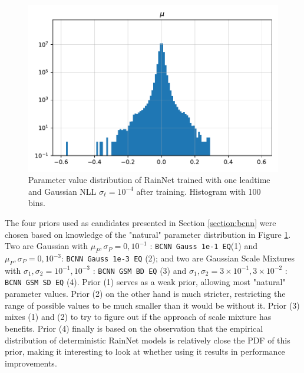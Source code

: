 \begin{figure}
	\centering
	\includegraphics[width=\linewidth]{images/weight/bcnn_rn_t1_lt5}
	\caption{Parameter value distribution of RainNet trained with one leadtime and Gaussian NLL $\sigma_\ell = 10^{-4}$ after training. Histogram with 100 bins.}
	\label{fig:rn-weight}
\end{figure}


The four priors used as candidates presented in Section \ref{section:bcnn} were chosen based on knowledge of the "natural" parameter distribution in Figure \ref{fig:rn-weight}. Two are Gaussian with $\mu_P, \sigma_P = 0,10^{-1}$ : \texttt{BCNN Gauss 1e-1 EQ}(1) and $\mu_P, \sigma_P = 0,10^{-3}$: \texttt{BCNN Gauss 1e-3 EQ} (2); and two are Gaussian Scale Mixtures with $\sigma_1,\sigma_2 = 10^{-1}, 10^{-3}$ : \texttt{BCNN GSM BD EQ} (3) and $\sigma_1,\sigma_2 = 3 \times 10^{-1}, 3 \times 10^{-2}$ : \texttt{BCNN GSM SD EQ} (4). 
Prior (1) serves as a weak prior, allowing most "natural" parameter values. Prior (2) on the other hand is much stricter, restricting the range of possible values to be much smaller than it would be without it. Prior (3) mixes (1) and (2) to try to figure out if the approach of scale mixture has benefits. Prior (4) finally is based on the observation that the empirical distribution of deterministic RainNet models is relatively close the PDF of this prior, making it interesting to look at whether using it results in performance improvements.


